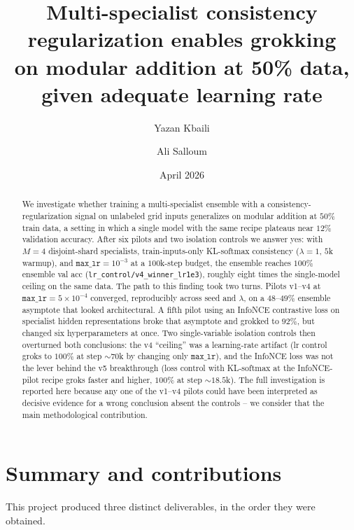 \documentclass[11pt,a4paper]{article}
\title{Multi-specialist consistency regularization enables grokking\\
       on modular addition at 50\% data, given adequate learning rate}
\author{Yazan Kbaili \and Ali Salloum}
\date{April 2026}
\begin{document}
\maketitle

\begin{abstract}
\noindent We investigate whether training a multi-specialist ensemble
with a consistency-regularization signal on unlabeled grid inputs
generalizes on modular addition at $50\%$ train data, a setting in
which a single model with the same recipe plateaus near $12\%$
validation accuracy. After six pilots and two isolation controls we
answer yes: with $M{=}4$ disjoint-shard specialists, train-inputs-only
KL-softmax consistency ($\lambda{=}1$, $5$k warmup), and
$\mathtt{max\_lr}{=}10^{-3}$ at a $100$k-step budget, the ensemble
reaches $100\%$ ensemble val acc (\texttt{lr\_control/v4\_winner\_lr1e3}),
roughly eight times the single-model ceiling on the same data.
The path to this finding took two turns. Pilots v1--v4 at
$\mathtt{max\_lr}{=}5{\times}10^{-4}$ converged, reproducibly across
seed and $\lambda$, on a $48$--$49\%$ ensemble asymptote that looked
architectural. A fifth pilot using an InfoNCE contrastive loss on
specialist hidden representations broke that asymptote and grokked
to $92\%$, but changed six hyperparameters at once. Two
single-variable isolation controls then overturned both conclusions:
the v4 ``ceiling'' was a learning-rate artifact (lr control groks to
$100\%$ at step $\sim$$70$k by changing only $\mathtt{max\_lr}$), and
the InfoNCE loss was not the lever behind the v5 breakthrough (loss
control with KL-softmax at the InfoNCE-pilot recipe groks faster and
higher, $100\%$ at step $\sim$$18.5$k). The full investigation is
reported here because any one of the v1--v4 pilots could have been
interpreted as decisive evidence for a wrong conclusion absent the
controls -- we consider that the main methodological contribution.
\end{abstract}

\section{Summary and contributions}
\label{sec:summary}

This project produced three distinct deliverables, in the order they
were obtained.
\end{document}
